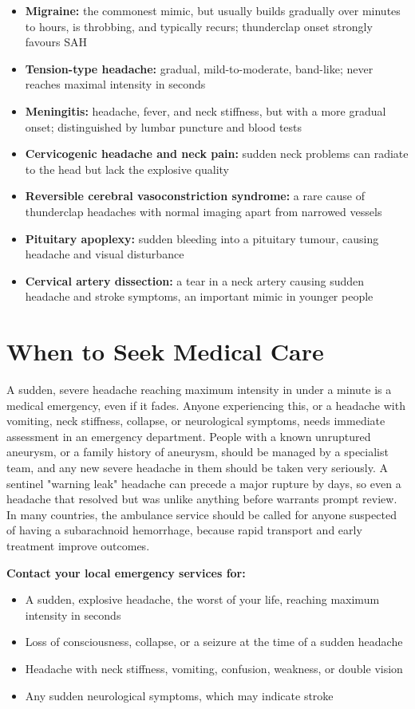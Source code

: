 \begin{itemize}
    \item \textbf{Migraine:} the commonest mimic, but usually builds gradually over minutes to hours, is throbbing, and typically recurs; thunderclap onset strongly favours SAH
    \item \textbf{Tension-type headache:} gradual, mild-to-moderate, band-like; never reaches maximal intensity in seconds
    \item \textbf{Meningitis:} headache, fever, and neck stiffness, but with a more gradual onset; distinguished by lumbar puncture and blood tests
    \item \textbf{Cervicogenic headache and neck pain:} sudden neck problems can radiate to the head but lack the explosive quality
    \item \textbf{Reversible cerebral vasoconstriction syndrome:} a rare cause of thunderclap headaches with normal imaging apart from narrowed vessels
    \item \textbf{Pituitary apoplexy:} sudden bleeding into a pituitary tumour, causing headache and visual disturbance
    \item \textbf{Cervical artery dissection:} a tear in a neck artery causing sudden headache and stroke symptoms, an important mimic in younger people
\end{itemize}

\section*{When to Seek Medical Care}
A sudden, severe headache reaching maximum intensity in under a minute is a medical emergency, even if it fades. Anyone experiencing this, or a headache with vomiting, neck stiffness, collapse, or neurological symptoms, needs immediate assessment in an emergency department. People with a known unruptured aneurysm, or a family history of aneurysm, should be managed by a specialist team, and any new severe headache in them should be taken very seriously. A sentinel "warning leak" headache can precede a major rupture by days, so even a headache that resolved but was unlike anything before warrants prompt review. In many countries, the ambulance service should be called for anyone suspected of having a subarachnoid hemorrhage, because rapid transport and early treatment improve outcomes.

\textbf{Contact your local emergency services for:}
\begin{itemize}
    \item A sudden, explosive headache, the worst of your life, reaching maximum intensity in seconds
    \item Loss of consciousness, collapse, or a seizure at the time of a sudden headache
    \item Headache with neck stiffness, vomiting, confusion, weakness, or double vision
    \item Any sudden neurological symptoms, which may indicate stroke
\end{itemize}

